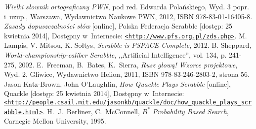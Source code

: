 \documentclass[a4paper,twocolumn,12pt]{article}
\theoremstyle{definition}
\begin{document}
\begin{thebibliography}{9}
	\small
		\emph{Wielki słownik ortograficzny PWN}, pod red. Edwarda Polańskiego, Wyd. 3 popr. i~uzup., Warszawa, Wydawnictwo Naukowe PWN, 2012, ISBN 978-83-01-16405-8.
		\emph{Zasady dopuszczalności słów} [online], Polska Federacja Scrabble [dostęp: 25 kwietnia 2014], Dostępny w~Internecie: \href{http://www.pfs.org.pl/zds.php}{\nolinkurl{<http://www.pfs.org.pl/zds.php>}}.
	 M. Lampis, V. Mitsou, K. Sołtys, \emph{Scrabble is PSPACE-Complete}, 2012.
	 B. Sheppard, \emph{World-championship-caliber Scrabble}, ,,Artificial Intelligence'', vol. 134, p. 241-275, 2002.
	 E.~Freeman, B.~Bates, K.~Sierra, \emph{Rusz głową! Wzorce projektowe}, Wyd. 2, Gliwice, Wydawnictwo Helion, 2011, ISBN 978-83-246-2803-2, strona 56.
		Jason Katz-Brown, John O'Laughlin, \emph{How Quackle Plays Scrabble} [online], Quackle [dostęp: 25 kwietnia 2014], Dostępny w~Internecie: \href{http://people.csail.mit.edu/jasonkb/quackle/doc/how_quackle_plays_scrabble.html}{\nolinkurl{<http://people.csail.mit.edu/jasonkb/quackle/doc/how\_quackle\_plays\_scrabble.html>}}.
	 H.~J.~Berliner, C.~McConnell, \emph{$B^{*}$ Probability Based Search}, Carnegie Mellon University, 1995.
\end{thebibliography}
\end{document}
